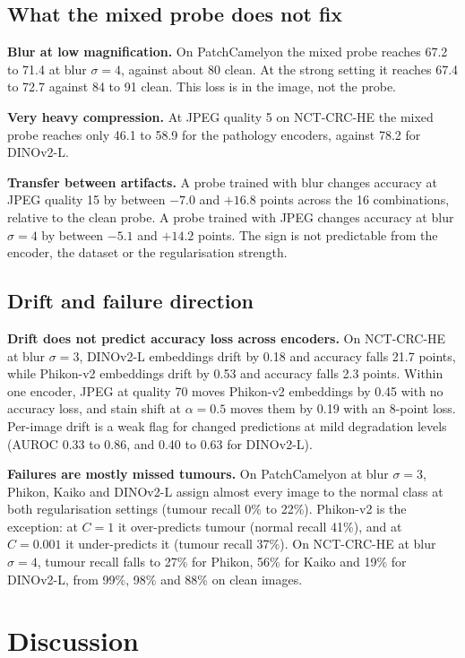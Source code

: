 \documentclass[11pt,a4paper]{article}
\begin{document}
\subsection{What the mixed probe does not fix}

\textbf{Blur at low magnification.} On PatchCamelyon the mixed probe reaches 67.2 to 71.4 at blur $\sigma = 4$, against about 80 clean. At the strong setting it reaches 67.4 to 72.7 against 84 to 91 clean. This loss is in the image, not the probe.

\textbf{Very heavy compression.} At JPEG quality 5 on NCT-CRC-HE the mixed probe reaches only 46.1 to 58.9 for the pathology encoders, against 78.2 for DINOv2-L.

\textbf{Transfer between artifacts.} A probe trained with blur changes accuracy at JPEG quality 15 by between $-7.0$ and $+16.8$ points across the 16 combinations, relative to the clean probe. A probe trained with JPEG changes accuracy at blur $\sigma = 4$ by between $-5.1$ and $+14.2$ points. The sign is not predictable from the encoder, the dataset or the regularisation strength.

\subsection{Drift and failure direction}

\textbf{Drift does not predict accuracy loss across encoders.} On NCT-CRC-HE at blur $\sigma = 3$, DINOv2-L embeddings drift by 0.18 and accuracy falls 21.7 points, while Phikon-v2 embeddings drift by 0.53 and accuracy falls 2.3 points. Within one encoder, JPEG at quality 70 moves Phikon-v2 embeddings by 0.45 with no accuracy loss, and stain shift at $\alpha = 0.5$ moves them by 0.19 with an 8-point loss. Per-image drift is a weak flag for changed predictions at mild degradation levels (AUROC 0.33 to 0.86, and 0.40 to 0.63 for DINOv2-L).

\textbf{Failures are mostly missed tumours.} On PatchCamelyon at blur $\sigma = 3$, Phikon, Kaiko and DINOv2-L assign almost every image to the normal class at both regularisation settings (tumour recall 0\% to 22\%). Phikon-v2 is the exception: at $C = 1$ it over-predicts tumour (normal recall 41\%), and at $C = 0.001$ it under-predicts it (tumour recall 37\%). On NCT-CRC-HE at blur $\sigma = 4$, tumour recall falls to 27\% for Phikon, 56\% for Kaiko and 19\% for DINOv2-L, from 99\%, 98\% and 88\% on clean images.

\section{Discussion}
\end{document}
